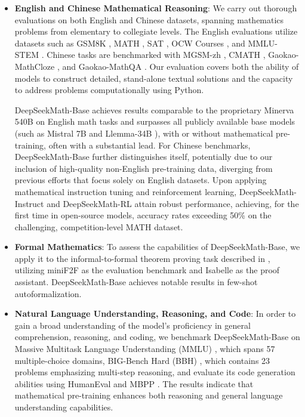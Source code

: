 \begin{itemize}[topsep=0pt]
    \item \textbf{English and Chinese Mathematical Reasoning}: We carry out thorough evaluations on both English and Chinese datasets, spanning mathematics problems from elementary to collegiate levels. The English evaluations utilize datasets such as GSM8K \citep{gsm8k}, MATH \citep{MATH}, SAT \citep{llemma}, OCW Courses \citep{minerva}, and MMLU-STEM \citep{mmlu}. Chinese tasks are benchmarked with MGSM-zh \citep{mgsm}, CMATH \citep{wei2023cmath}, Gaokao-MathCloze \citep{agieval}, and Gaokao-MathQA \citep{agieval}. Our evaluation covers both the ability of models to construct detailed, stand-alone textual solutions and the capacity to address problems computationally using Python.

    DeepSeekMath-Base achieves results comparable to the proprietary Minerva 540B \citep{minerva} on English math tasks and surpasses all publicly available base models (such as Mistral 7B \citep{mistral} and Llemma-34B \citep{llemma}), with or without mathematical pre-training, often with a substantial lead. For Chinese benchmarks, DeepSeekMath-Base further distinguishes itself, potentially due to our inclusion of high-quality non-English pre-training data, diverging from previous efforts \citep{minerva,llemma} that focus solely on English datasets. Upon applying mathematical instruction tuning and reinforcement learning, DeepSeekMath-Instruct and DeepSeekMath-RL attain robust performance, achieving, for the first time in open-source models, accuracy rates exceeding 50\% on the challenging, competition-level MATH dataset.

\item \textbf{Formal Mathematics}: To assess the capabilities of DeepSeekMath-Base, we apply it to the informal-to-formal theorem proving task described in \citep{dsp_proof}, utilizing miniF2F \citep{minif2f} as the evaluation benchmark and Isabelle \citep{isabelle} as the proof assistant. DeepSeekMath-Base achieves notable results in few-shot autoformalization.

\item \textbf{Natural Language Understanding, Reasoning, and Code}: In order to gain a broad understanding of the model's proficiency in general comprehension, reasoning, and coding, we benchmark DeepSeekMath-Base on Massive Multitask Language Understanding (MMLU) \citep{mmlu}, which spans 57 multiple-choice domains, BIG-Bench Hard (BBH) \citep{bbh}, which contains 23 problems emphasizing multi-step reasoning, and evaluate its code generation abilities using HumanEval \citep{codex} and MBPP \citep{mbpp}. The results indicate that mathematical pre-training enhances both reasoning and general language understanding capabilities.


\end{itemize}
